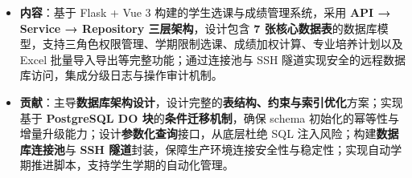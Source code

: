 \begin{itemize}
  \item \textbf{内容}：基于 Flask + Vue 3 构建的学生选课与成绩管理系统，采用 \textbf{API → Service → Repository 三层架构}，设计包含 \textbf{7 张核心数据表}的数据库模型，支持三角色权限管理、学期限制选课、成绩加权计算、专业培养计划以及 Excel 批量导入导出等完整功能；通过连接池与 SSH 隧道实现安全的远程数据库访问，集成分级日志与操作审计机制。
  
  \item \textbf{贡献}：主导\textbf{数据库架构设计}，设计完整的\textbf{表结构、约束与索引优化}方案；实现基于 \textbf{PostgreSQL DO 块}的\textbf{条件迁移机制}，确保 schema 初始化的幂等性与增量升级能力；设计\textbf{参数化查询}接口，从底层杜绝 SQL 注入风险；构建\textbf{数据库连接池}与 \textbf{SSH 隧道}封装，保障生产环境连接安全性与稳定性；实现自动学期推进脚本，支持学生学期的自动化管理。
\end{itemize}
